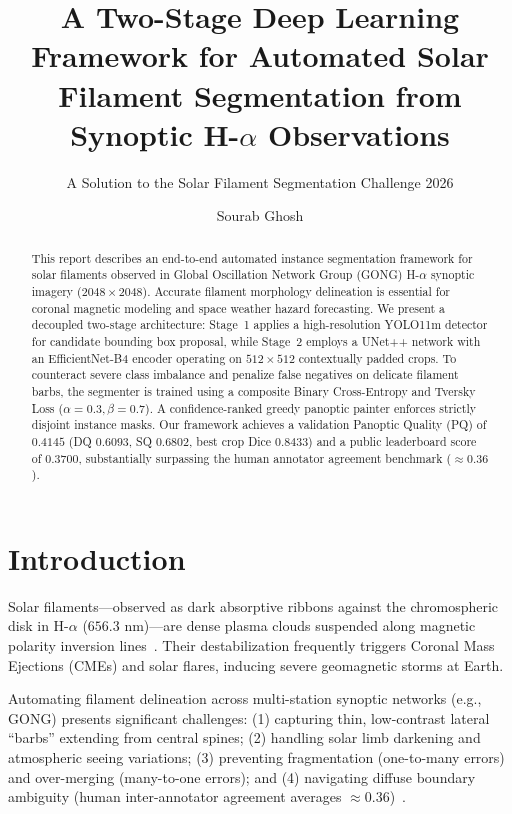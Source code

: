 \documentclass[sigconf]{acmart}
\begin{document}
\title{A Two-Stage Deep Learning Framework for Automated Solar Filament Segmentation from Synoptic H-$\alpha$ Observations}
\subtitle{A Solution to the Solar Filament Segmentation Challenge 2026}

\author{Sourab Ghosh}

\begin{abstract}
    This report describes an end-to-end automated instance segmentation framework for solar filaments observed in Global Oscillation Network Group (GONG) H-$\alpha$ synoptic imagery ($2048 \times 2048$). Accurate filament morphology delineation is essential for coronal magnetic modeling and space weather hazard forecasting. We present a decoupled two-stage architecture: Stage~1 applies a high-resolution YOLO11m detector for candidate bounding box proposal, while Stage~2 employs a UNet++ network with an EfficientNet-B4 encoder operating on $512 \times 512$ contextually padded crops. To counteract severe class imbalance and penalize false negatives on delicate filament barbs, the segmenter is trained using a composite Binary Cross-Entropy and Tversky Loss ($\alpha=0.3, \beta=0.7$). A confidence-ranked greedy panoptic painter enforces strictly disjoint instance masks. Our framework achieves a validation Panoptic Quality (PQ) of $0.4145$ (DQ $0.6093$, SQ $0.6802$, best crop Dice $0.8433$) and a public leaderboard score of $0.3700$, substantially surpassing the human annotator agreement benchmark ($\approx 0.36$).
\end{abstract}

\maketitle

\section{Introduction}

Solar filaments—observed as dark absorptive ribbons against the chromospheric disk in H-$\alpha$ ($656.3\text{ nm}$)—are dense plasma clouds suspended along magnetic polarity inversion lines~\cite{ahmadzadeh2024dataset}. Their destabilization frequently triggers Coronal Mass Ejections (CMEs) and solar flares, inducing severe geomagnetic storms at Earth.

Automating filament delineation across multi-station synoptic networks (e.g., GONG) presents significant challenges: (1) capturing thin, low-contrast lateral ``barbs'' extending from central spines; (2) handling solar limb darkening and atmospheric seeing variations; (3) preventing fragmentation (one-to-many errors) and over-merging (many-to-one errors); and (4) navigating diffuse boundary ambiguity (human inter-annotator agreement averages $\approx 0.36$)~\cite{ahmadzadeh2024dataset}.
\end{document}

